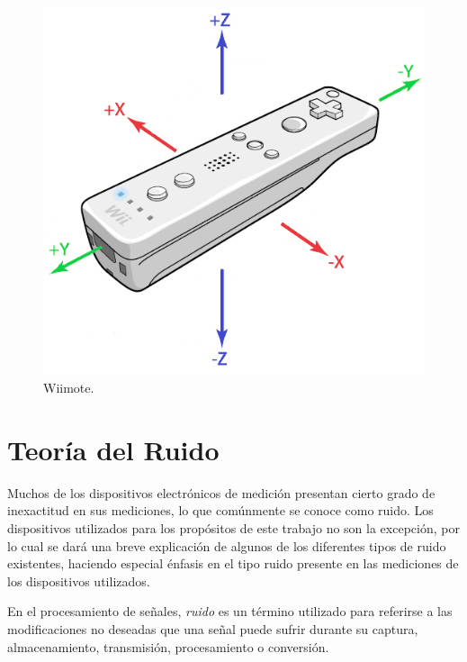 \begin{figure}[H]
\centering
\includegraphics[scale=0.65]{wiimote2.png}
\caption[Caption for LOF]{Wiimote\footnotemark[1].}
\label{figura5}
\end{figure}

\section{Teoría del Ruido}

Muchos de los dispositivos electrónicos de medición presentan cierto grado de inexactitud en sus mediciones, lo que comúnmente se conoce como ruido.
Los dispositivos utilizados para los propósitos de este trabajo no son la excepción, por lo cual se dará una breve explicación de algunos de los diferentes tipos de ruido existentes\footnotemark[7], haciendo especial énfasis en el tipo ruido presente en las mediciones de los dispositivos utilizados.

En el procesamiento de señales, {\em ruido} es un término utilizado para referirse a las modificaciones no deseadas que una señal puede sufrir durante su captura, almacenamiento, transmisión, procesamiento o conversión.

